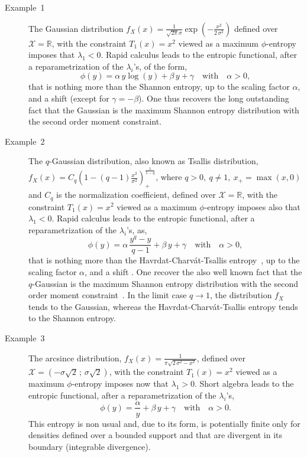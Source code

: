\documentclass[english,sort&compress]{elsarticle}
\theoremstyle{definition}
\theoremstyle{plain}
\theoremstyle{plain}
\def\Rset{\mathbb{R}}
\def\X{\mathcal{X}}
\begin{document}
\begin{description}%
\item[Example~1]  The  Gaussian  distribution $f_X(x)  =  \frac{1}{\sqrt{2  \pi}
  \sigma} \exp\left(  - \frac{x^2}{2  \, \sigma^2} \right)$  defined over  $\X =
  \Rset$, with the constraint $T_1(x) =  x^2$ viewed as a maximum $\phi$-entropy
  imposes  that  $\lambda_1  <  0$.    Rapid  calculus  leads  to  the  entropic
  functional,   after  a   reparametrization  of   the  $\lambda_i$'s,   of  the
  form, $$\phi(y) = \alpha \, y \log(y)  + \beta \, y + \gamma \quad \mbox{with}
  \quad \alpha > 0,$$  that is nothing more than the Shannon  entropy, up to the
  scaling factor $\alpha$, and a shift  (except for $\gamma = -\beta$). One thus
  recovers the  long outstanding fact that  the Gaussian is the  maximum Shannon
  entropy distribution with the second order moment constraint.
%
\item[Example~2]   The  $q$-Gaussian   distribution,  also   known  as   Tsallis
  distribution,   $f_X(x)  =   C_q   \left(  1   -  (q-1)   \frac{x^2}{\sigma^2}
  \right)_+^{\frac{1}{1-q}}$, where $q > 0, \: q  \ne 1, \: x_+ = \max(x,0)$ and
  $C_q$ is  the normalization coefficient, defined  over $\X = \Rset$,  with the
  constraint $T_1(x) = x^2$ viewed as a maximum $\phi$-entropy imposes also that
  $\lambda_1 <  0$.  Rapid calculus  leads to  the entropic functional,  after a
  reparametrization   of  the   $\lambda_i$'s,   as,  $$\phi(y)   =  \alpha   \,
  \frac{y^q-y}{q-1} + \beta \, y +  \gamma \quad \mbox{with} \quad \alpha > 0,$$
  that     is     nothing     more    than     the     Havrdat-Charv\'at-Tsallis
  entropy~\cite{HavCha67,  Dar70, Tsa88,  CosHer03},  up to  the scaling  factor
  $\alpha$, and  a shift .  One  recover the
  also well  known fact  that the  $q$-Gaussian is  the maximum  Shannon entropy
  distribution with the second  order moment constraint~\cite{CosHer03}.  In the
  limit case  $q \to 1$, the  distribution $f_X$ tends to  the Gaussian, whereas
  the Havrdat-Charv\'at-Tsallis entropy tends to the Shannon entropy.
%
\item[Example~3] The  arcsince distribution,  $f_X(x) = \frac{1}{\pi  \sqrt{2 \,
    \sigma^2 - x^2}}$, defined  over $\X = \left( -\sigma \sqrt2  \, ; \, \sigma
  \sqrt2  \right)$, with  the  constraint $T_1(x)  = x^2$  viewed  as a  maximum
  $\phi$-entropy imposes  now that $\lambda_1 >  0$. Short algebra leads  to the
  entropic functional, after a reparametrization of the $\lambda_i$'s, $$\phi(y)
  = \frac{\alpha}{y} + \beta \, y + \gamma \quad \mbox{with} \quad \alpha > 0.$$
  This entropy is non usual and, due to its form, is potentially finite only for
  densities  defined over  a  bounded  support and  that  are  divergent in  its
  boundary (integrable divergence).
\end{description}
\end{document}
